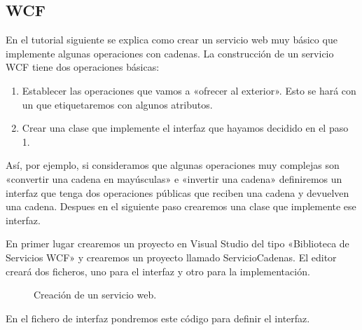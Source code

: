 \documentclass[letterpaper,10pt,spanish]{sphinxmanual}
\begin{document}
\subsection{WCF}
\label{\detokenize{textos/tema4:wcf}}
En el tutorial siguiente se explica como crear un servicio web muy básico que implemente algunas operaciones con cadenas. La construcción de un servicio WCF tiene dos operaciones básicas:
\begin{enumerate}
%
\item {} 
Establecer las operaciones que vamos a «ofrecer al exterior». Esto se hará con un  que etiquetaremos con algunos atributos.

\item {} 
Crear una clase que implemente el interfaz que hayamos decidido en el paso 1.

\end{enumerate}

Así, por ejemplo, si consideramos que algunas operaciones muy complejas son «convertir una cadena en mayúsculas» e «invertir una cadena» definiremos un interfaz que tenga dos operaciones públicas que reciben una cadena y devuelven una cadena. Despues en el siguiente paso crearemos una clase que implemente ese interfaz.

En primer lugar crearemos un proyecto en Visual Studio del tipo «Biblioteca de Servicios WCF» y crearemos un proyecto llamado ServicioCadenas. El editor creará dos ficheros, uno para el interfaz y otro para la implementación.

\begin{figure}[htbp]
\centering
\capstart

\noindent{}
\caption{Creación de un servicio web.}\label{\detokenize{textos/tema4:id1}}\end{figure}

En el fichero de interfaz pondremos este código para definir el interfaz.

\begin{sphinxVerbatim}[commandchars=\\\{\}]
 
 
 
 
 
 

 
      

          
          
\end{sphinxVerbatim}
\end{document}
